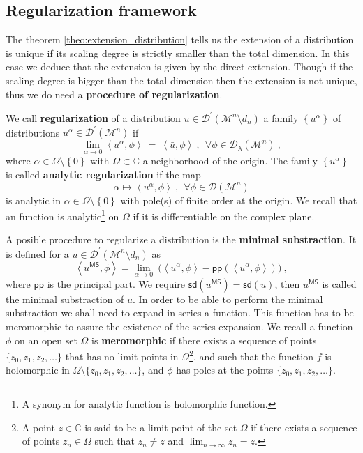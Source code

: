 \documentclass[12pt]{book}
\newcommand{\pp}{\mathsf{pp}}
\newcommand{\sd}{\mathsf{sd}}
\newcommand{\sm}[1]{\left\langle#1\right\rangle}
\newcommand{\Dcal}{\mathcal{D}}
\newcommand{\Mcal}{\mathcal{M}}
\newcommand{\Cbb}{\mathbb{C}}
\theoremstyle{break}
\begin{document}
\subsection{Regularization framework}


The theorem \ref{theo:extension_distribution} tells us the extension of a distribution is unique if its scaling degree is strictly smaller than the total dimension. In this case we deduce that the extension is given by the direct extension. Though if the scaling degree is bigger than the total dimension then the extension is not unique, thus we do need a \textbf{procedure of regularization}.


\bigskip


We call \textbf{regularization} of a distribution $u \in \Dcal^\prime(\Mcal^n\setminus d_n)$ a family $\left\{ u^{\alpha}\right\}$ of distributions $u^{\alpha}\in\Dcal^\prime(\Mcal^n)$ if
%
\begin{equation*}
\lim_{\alpha \to 0} \sm{u^{\alpha},\phi} \ = \ \sm{\bar{u},\phi} \ , \ \ \forall \phi \in \Dcal_{\lambda}(\Mcal^n) \ , 
\end{equation*}
%
where $\alpha \in \Omega\setminus\left\{ 0\right\}$ with $\Omega\subset\mathbb{C}$ a neighborhood of the origin. The family $\left\{ u^{\alpha}\right\}$ is called \textbf{analytic regularization} if the map 
% 
\begin{equation*}
\alpha \mapsto \sm{u^{\alpha},\phi} \ , \ \ \forall \phi \in \Dcal(\Mcal^n)
\end{equation*}
%
is analytic in $\alpha\in\Omega\setminus\left\{ 0\right\}$ with pole(s) of finite order at the origin. We recall that an function is analytic\footnote{A synonym for analytic function is holomorphic function.} on $\Omega$ if it is differentiable on the complex plane.  

 
 
A posible procedure to regularize a distribution is the \textbf{minimal substraction}. It is defined for a $u \in \Dcal^\prime(\Mcal^n \setminus d_n)$ as 
%
\begin{equation*}
\sm{u^{\mathsf{MS}},\phi} = \lim_{\alpha \to 0} \ \bigg( \sm{u^\alpha , \phi} - \pp\left(\sm{u^\alpha , \phi}\right) \bigg) \ ,
\end{equation*}
%
where $\pp$ is the principal part. We require $\sd(u^{\mathsf{MS}}) = \sd(u)$, then $u^{\mathsf{MS}}$ is called the minimal substraction of $u$. In order to be able to perform the minimal substraction we shall need to expand in series a function. This function has to be meromorphic to assure the existence of the series expansion. We recall a function $\phi$ on an open set $\Omega$ is \textbf{meromorphic} if there exists a sequence of points $\{z_0 , z_1 , z_2 , \dots \}$ that has no limit points in $\Omega$\footnote{A point $z \in \Cbb$ is said to be a limit point of the set $\Omega$ if there exists a sequence of points $z_n \in \Omega$ such that $z_n \neq z$ and $\lim_{n \to \infty} z_n = z$.}, and such
that the function $f$ is holomorphic in $\Omega \setminus \{z_0 , z_1 , z_2 , \dots \}$, and $\phi$ has poles at the points $\{z_0 , z_1 , z_2 , \dots \}$.
\end{document}
